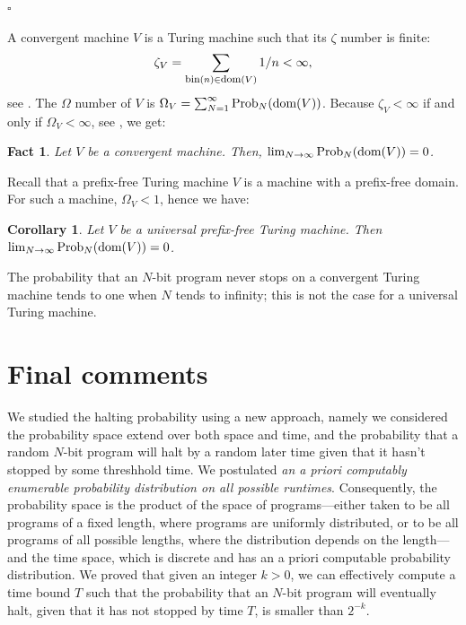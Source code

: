 \documentclass[12pt,twoside,openright]{report}
\newcommand{\QED}{\hfill $\square$}
\newcommand{\dom}{\mbox{\rm dom}}
\newcommand{\fdom}{\mbox{\rm \footnotesize{dom}}}
\newcommand{\fbin}{\mbox{\rm \footnotesize{bin}}}
\newcommand{\Prob}{{\rm Prob}}
\newtheorem{fact}[thm]{Fact}
\newtheorem{cor}[thm]{Corollary}
\begin{document}
\QED

\medskip

A convergent machine $V$ is a Turing machine such that its $\zeta$ number is finite:
$$\zeta_{V} = \sum_{\fbin (n) \in \fdom (V)} 1/n <\infty,$$ see \cite{CSNatural2006}. The $\Omega$ number of $V$ is $\Omega_{V} =\sum_{N=1}^{\infty} \Prob_{N}(\dom (V))$. Because $\zeta_{V} < \infty $ if and only if $\Omega_{V} < \infty$, see \cite{CSNatural2006}, we get:

\medskip

\begin{fact} 
Let $V$ be a convergent machine. Then, $\lim_{N \rightarrow \infty} \Prob_{N}(\dom (V)) =0$. 
\end{fact}

\medskip

Recall that a prefix-free  Turing machine  $V$ is a machine with a prefix-free domain. For such a machine, $\Omega_{V} < 1$, hence we have:

\medskip

\begin{cor} 
Let $V$ be a universal prefix-free Turing machine.  Then $\lim_{N \rightarrow \infty} \Prob_{N}(\dom (V)) =0$. 
\end{cor}

\medskip

The probability that an $N$-bit program never stops on a convergent Turing machine tends to one when $N$ tends to infinity; this is not the case for a universal Turing machine. 
      
\section{Final comments}

We studied the halting probability using a new approach, namely we considered the probability space extend over both space and time, and the probability that a random $N$-bit program will halt by a random later time given that it hasn't stopped by some threshhold time.  We postulated {\it an a priori computably enumerable probability distribution on all possible runtimes}.  Consequently, the probability space is the product of the space of programs---either taken to be all programs of a fixed length, where programs are uniformly distributed, or to be all programs of all possible lengths, where the distribution depends on the length---and the time space, which is discrete and has an a priori computable probability distribution.   We proved  that given an integer $k>0$, we can effectively compute  a time bound $T$ such that  the probability that an $N$-bit program will eventually halt, given that it has not stopped by time $T$, is smaller than $2^{-k}$.  
\end{document}
